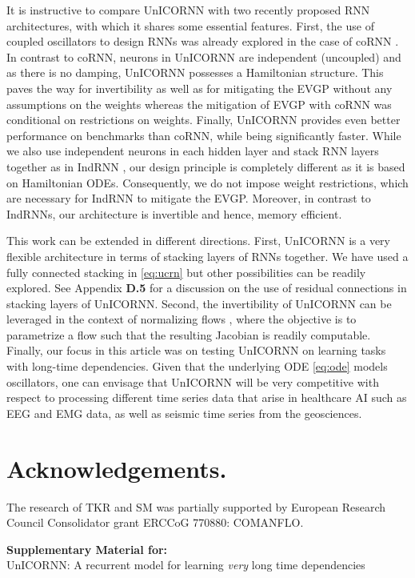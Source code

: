 \documentclass[a4paper]{article}
\begin{document}
It is instructive to compare UnICORNN with two recently proposed RNN architectures, with which it shares some essential features. First, the use of coupled oscillators to design RNNs was already explored in the case of coRNN \cite{coRNN}. In contrast to coRNN, neurons in UnICORNN are independent (uncoupled) and as there is no damping, UnICORNN possesses a Hamiltonian structure. This paves the way for invertibility as well as for mitigating the EVGP without any assumptions on the weights whereas the mitigation of EVGP with coRNN was conditional on restrictions on weights. Finally, UnICORNN provides even better performance on benchmarks than coRNN, while being significantly faster. While we also use independent neurons in each hidden layer and stack RNN layers together as in IndRNN \cite{indrnn}, our design principle is completely different as it is based on Hamiltonian ODEs. Consequently, we do not impose weight restrictions, which are necessary for IndRNN to mitigate the EVGP. Moreover, in contrast to IndRNNs, our architecture is invertible and hence, memory efficient. 

This work can be extended in different directions. First, UnICORNN is a very flexible architecture in terms of stacking layers of RNNs together. We have used a fully connected stacking in \eqref{eq:ucrn} but other possibilities can be readily explored. See Appendix {\bf D.5} for a discussion on the use of residual connections in stacking layers of UnICORNN. Second, the invertibility of UnICORNN can be leveraged in the context of normalizing flows \cite{nf}, where the objective is to parametrize a flow such that the resulting Jacobian is readily computable. Finally, our focus in this article was on testing UnICORNN on learning tasks with long-time dependencies. Given that the underlying ODE \eqref{eq:ode} models oscillators, one can envisage that UnICORNN will be very competitive with respect to processing different time series data that arise in healthcare AI such as EEG and EMG data, as well as seismic time series from the geosciences. 


\section*{Acknowledgements.} The research of TKR and SM was partially supported by European Research Council Consolidator grant ERCCoG 770880: COMANFLO.



\appendix
\newpage
\begin{center}
{\bf Supplementary Material for:}\\
UnICORNN: A recurrent model for learning \textit{very} long time dependencies
\end{center}
\end{document}
